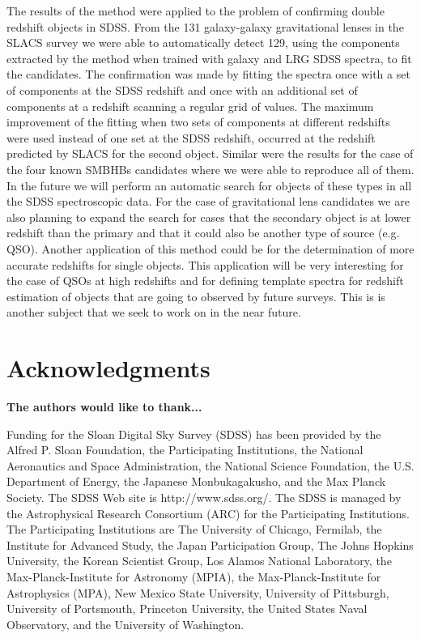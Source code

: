 \documentclass[12pt,preprint]{aastex}
\begin{document}
The results of the method were applied to the problem of confirming double redshift objects in SDSS. From the 131 galaxy-galaxy gravitational lenses in the SLACS survey we were able to automatically detect 129, using the components extracted by the method when trained with galaxy and LRG SDSS spectra, to fit the candidates. The confirmation was made by fitting the spectra once with a set of components at the SDSS redshift and once with an additional set of components at a redshift scanning a regular grid of values. The maximum improvement of the fitting when two sets of components at different redshifts were used instead of one set at the SDSS redshift, occurred at the redshift predicted by SLACS for the second object. Similar were the results for the case of the four known SMBHBs candidates where we were able to reproduce all of them. In the future we will perform an automatic search for objects of these types in all the SDSS spectroscopic data. For the case of gravitational lens candidates we are also planning to expand the search for cases that the secondary object is at lower redshift than the primary and that it could also be another type of source (e.g. QSO). Another application of this method could be for the determination of more accurate redshifts for single objects. This application will be very interesting for the case of QSOs at high redshifts and for defining template spectra for redshift estimation of objects that are going to observed by future surveys. This is is another subject that we seek to work on in the near future.

\section{Acknowledgments}
\textbf{The authors would like to thank...}

Funding for the Sloan Digital Sky Survey (SDSS) has been provided by the Alfred P. Sloan Foundation, the Participating Institutions, the National Aeronautics and Space Administration, the National Science Foundation, the U.S. Department of Energy, the Japanese Monbukagakusho, and the Max Planck Society. The SDSS Web site is http://www.sdss.org/. The SDSS is managed by the Astrophysical Research Consortium (ARC) for the Participating Institutions. The Participating Institutions are The University of Chicago, Fermilab, the Institute for Advanced Study, the Japan Participation Group, The Johns Hopkins University, the Korean Scientist Group, Los Alamos National Laboratory, the Max-Planck-Institute for Astronomy (MPIA), the Max-Planck-Institute for Astrophysics (MPA), New Mexico State University, University of Pittsburgh, University of Portsmouth, Princeton University, the United States Naval Observatory, and the University of Washington.
\end{document}
